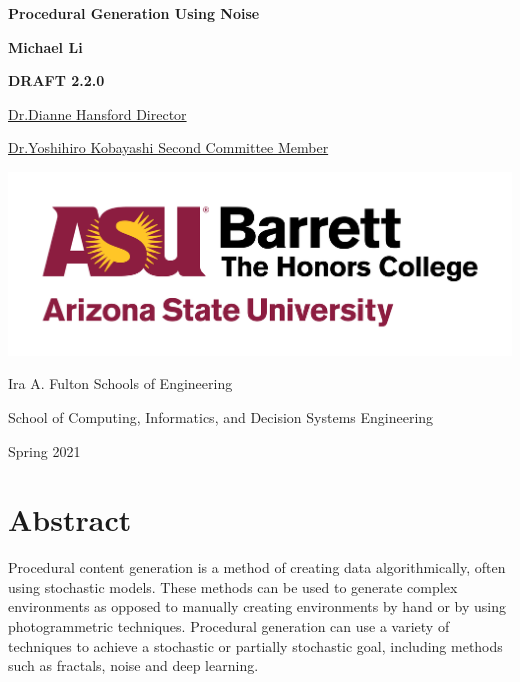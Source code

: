 \documentclass[10pt]{report}
\begin{document}
	\begin{titlepage}
		\begin{center}
			\Large
			\textbf{Procedural Generation Using Noise}
			
			\vspace{1.5cm}
			\normalsize
			\textbf{Michael Li}
			
			\vfill
			
			\textbf{DRAFT 2.2.0}
			
			\uline{Dr.Dianne Hansford \hfill Director}
			\vspace{1cm}
			
			\uline{Dr.Yoshihiro Kobayashi \hfill Second Committee Member}
			
			\vspace{3cm}
			
			\includegraphics[scale=.5]{asu_barretthonors_horiz_rgb_maroongold_600ppi}
			
			\vspace{1.5cm}
			Ira A. Fulton Schools of Engineering
			
			School of Computing, Informatics, and Decision Systems Engineering
			
			Spring 2021
			
		\end{center}
	\end{titlepage}
	
	\chapter*{Abstract}
	
	Procedural content generation is a method of creating data algorithmically, often using stochastic models. These methods can be used to generate complex environments as opposed to manually creating environments by hand or by using photogrammetric techniques. Procedural generation can use a variety of techniques to achieve a stochastic or partially stochastic goal, including methods such as fractals, noise and deep learning.
	
\end{document}
